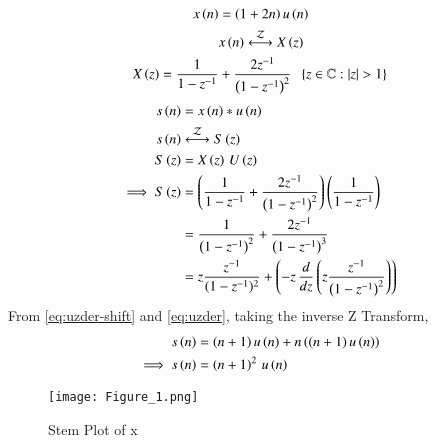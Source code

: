 \documentclass[journal,12pt,twocolumn]{IEEEtran}
\theoremstyle{remark}
\begin{document}
\begin{align}
    x\brak{n}&= \brak{1+2n}u\brak{n}\\
    &x\brak{n}\system{Z}X\brak{z}\notag\\
    X\brak{z}=\frac{1}{1-z^{-1}}&+\frac{2z^{-1}}{\brak{1-z^{-1}}^2}\;\;\cbrak{z\in\mathbb{C}: |z|>1}
\end{align}
\begin{align}
   s\brak{n}&=x\brak{n}*u\brak{n}\\
   s\brak{n}&\system{Z}S\brak{z}\notag\\
   S\brak{z}&=X\brak{z}\,U\brak{z}\\
   \implies S\brak{z}&=\brak{\frac{1}{1-z^{-1}}+\frac{2z^{-1}}{\brak{1-z^{-1}}^2}}\brak{\frac{1}{1-z^{-1}}}\\
   &=\frac{1}{\brak{1-z^{-1}}^2}+\frac{2z^{-1}}{\brak{1-z^{-1}}^3}\\
   &=z\frac{z^{-1}}{({1-z^{-1}})^2}+\brak{-z\,\frac{d}{dz}\brak{z\frac{z^{-1}}{\brak{1-z^{-1}}^2}}}
\end{align}
   From \eqref{eq:uzder-shift} and \eqref{eq:uzder}, taking the inverse Z Transform,
   \begin{align}
   s\left(n\right)&=\left(n+1\right)u\left(n\right)+n\left(\left(n+1\right)u\left(n\right)\right)\\
   \implies s\left(n\right)&=\left(n+1\right)^2\,u\left(n\right)
\end{align}
\begin{figure}[h!]
   \centering
   \texttt{[image: Figure\_1.png]}
   \caption{Stem Plot of x}
   \label{stemplot}
\end{figure}
\end{document}
